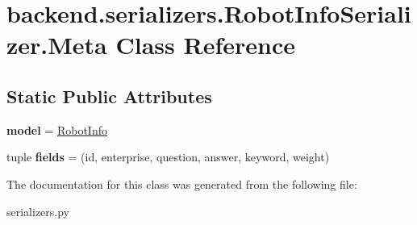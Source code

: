 \hypertarget{classbackend_1_1serializers_1_1_robot_info_serializer_1_1_meta}{}\section{backend.\+serializers.\+Robot\+Info\+Serializer.\+Meta Class Reference}
\label{classbackend_1_1serializers_1_1_robot_info_serializer_1_1_meta}
\subsection*{Static Public Attributes}
\begin{DoxyCompactItemize}
\item 
\mbox{\label{classbackend_1_1serializers_1_1_robot_info_serializer_1_1_meta_a9e28194531554ddadda68a8739c2513c}} 
{\bfseries model} = \hyperlink{classbackend_1_1models_1_1_robot_info}{Robot\+Info}
\item 
\mbox{\label{classbackend_1_1serializers_1_1_robot_info_serializer_1_1_meta_a50657ceec4d129050450190a7dc9e5f9}} 
tuple {\bfseries fields} = (\textquotesingle{}id\textquotesingle{}, \textquotesingle{}enterprise\textquotesingle{}, \textquotesingle{}question\textquotesingle{}, \textquotesingle{}answer\textquotesingle{}, \textquotesingle{}keyword\textquotesingle{}, \textquotesingle{}weight\textquotesingle{})
\end{DoxyCompactItemize}


The documentation for this class was generated from the following file\+:\begin{DoxyCompactItemize}
\item 
serializers.\+py\end{DoxyCompactItemize}
